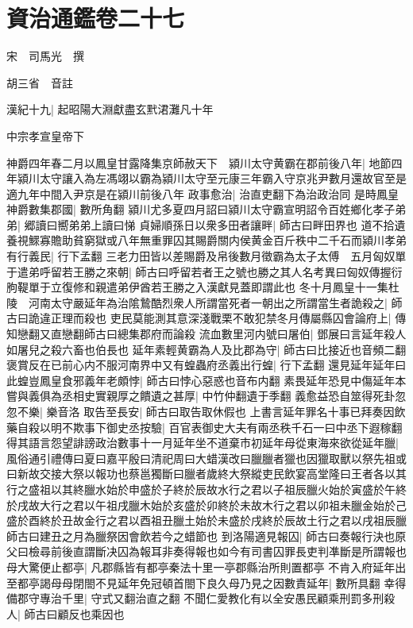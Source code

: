 \section{資治通鑑卷二十七}
宋　司馬光　撰

胡三省　音註

漢紀十九|{
	起昭陽大淵獻盡玄黓涒灘凡十年}


中宗孝宣皇帝下

神爵四年春二月以鳳皇甘露降集京師赦天下　潁川太守黄霸在郡前後八年|{
	地節四年潁川太守讓入為左馮翊以霸為潁川太守至元康三年霸入守京兆尹數月還故官至是適九年中間入尹京是在潁川前後八年}
政事愈治|{
	治直吏翻下為治政治同}
是時鳳皇神爵數集郡國|{
	數所角翻}
潁川尤多夏四月詔曰潁川太守霸宣明詔令百姓鄉化孝子弟弟|{
	郷讀曰嚮弟弟上讀曰悌}
貞婦順孫日以衆多田者讓畔|{
	師古曰畔田界也}
道不拾遺養視鰥寡贍助貧窮獄或八年無重罪囚其賜爵關内侯黄金百斤秩中二千石而潁川孝弟有行義民|{
	行下孟翻}
三老力田皆以差賜爵及帛後數月徵霸為太子太傅　五月匈奴單于遣弟呼留若王勝之來朝|{
	師古曰呼留若者王之號也勝之其人名考異曰匈奴傳握衍朐鞮單于立復修和親遣弟伊酋若王勝之入漢獻見蓋即謂此也}
冬十月鳳皇十一集杜陵　河南太守嚴延年為治隂鷙酷烈衆人所謂當死者一朝出之所謂當生者詭殺之|{
	師古曰詭違正理而殺也}
吏民莫能測其意深淺戰栗不敢犯禁冬月傳屬縣囚會論府上|{
	傳知戀翻又直戀翻師古曰總集郡府而論殺}
流血數里河内號曰屠伯|{
	鄧展曰言延年殺人如屠兒之殺六畜也伯長也}
延年素輕黄霸為人及比郡為守|{
	師古曰比接近也音頻二翻}
褒賞反在已前心内不服河南界中又有蝗蟲府丞義出行蝗|{
	行下孟翻}
還見延年延年曰此蝗豈鳳皇食邪義年老頗悖|{
	師古曰悖心惡惑也音布内翻}
素畏延年恐見中傷延年本嘗與義俱為丞相史實親厚之饋遺之甚厚|{
	中竹仲翻遺于季翻}
義愈益恐自筮得死卦忽忽不樂|{
	樂音洛}
取告至長安|{
	師古曰取告取休假也}
上書言延年罪名十事已拜奏因飲藥自殺以明不欺事下御史丞按驗|{
	百官表御史大夫有兩丞秩千石一曰中丞下遐稼翻}
得其語言怨望誹謗政治數事十一月延年坐不道棄市初延年母從東海來欲從延年臘|{
	風俗通引禮傳曰夏曰嘉平殷曰清祀周曰大蜡漢改曰臘臘者獵也因獵取獸以祭先祖或曰新故交接大祭以報功也蔡邕獨斷曰臘者歲終大祭縱吏民飲宴高堂隆曰王者各以其行之盛祖以其終臘水始於申盛於子終於辰故水行之君以子祖辰臘火始於寅盛於午終於戌故大行之君以午祖戌臘木始於亥盛於卯終於未故木行之君以卯祖未臘金始於己盛於酉終於丑故金行之君以酉祖丑臘土始於未盛於戌終於辰故土行之君以戌祖辰臘師古曰建丑之月為臘祭因會飲若今之蜡節也}
到洛陽適見報囚|{
	師古曰奏報行決也原父曰檢尋前後直謂斷决囚為報耳非奏得報也如今有司書囚罪長吏判凖斷是所謂報也}
母大驚便止都亭|{
	凡郡縣皆有都亭秦法十里一亭郡縣治所則置都亭}
不肯入府延年出至都亭謁母母閉閤不見延年免冠頓首閤下良久母乃見之因數責延年|{
	數所具翻}
幸得備郡守專治千里|{
	守式又翻治直之翻}
不聞仁愛教化有以全安愚民顧乘刑罰多刑殺人|{
	師古曰顧反也乘因也}
